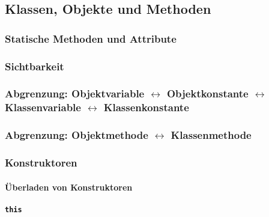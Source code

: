 
\subsection{Klassen, Objekte und Methoden}
	
	\subsubsection{Statische Methoden und Attribute}
	
	\subsubsection{Sichtbarkeit}
	
	\subsubsection{Abgrenzung: Objektvariable \(\leftrightarrow\) Objektkonstante \(\leftrightarrow\) Klassenvariable \(\leftrightarrow\) Klassenkonstante}
	
	\subsubsection{Abgrenzung: Objektmethode \(\leftrightarrow\) Klassenmethode}
	
	\subsubsection{Konstruktoren}
		
		\paragraph{Überladen von Konstruktoren}
		
		\paragraph{\texttt{this}}
		

